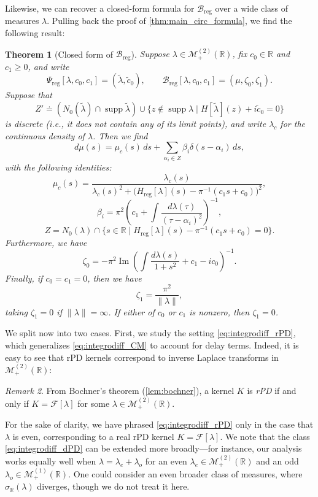 \documentclass{cams-l} %
\newcommand{\RR}{\mathbb R}
\newcommand{\cM}{\mathcal M}
\newcommand{\cB}{\mathcal B}
\newcommand{\cF}{\mathcal F}
\newcommand{\op}{\operatorname}
\newcommand{\supp}{\operatorname{supp}}
\renewcommand{\Im}{\op{Im}}
\newtheorem{theorem}{Theorem}[section]
\theoremstyle{definition}
\theoremstyle{remark}
\newtheorem{remark}[theorem]{Remark}
\numberwithin{equation}{section}
\begin{document}
Likewise, we can recover a closed-form formula for $\cB_\mathrm{reg}$ over a wide class of measures $\lambda$. Pulling back the proof of \cref{thm:main_circ_formula}, we find the following result:
\begin{theorem}[Closed form of $\cB_\mathrm{reg}$]\label{thm:main_regularizedH_formula}
    Suppose $\lambda\in\cM_+^{(2)}(\RR)$, fix $c_0\in\RR$ and $c_1\geq 0$, and write 
    \[\Psi_\mathrm{reg}[\lambda,c_0,c_1] = (\widetilde{\lambda},\widetilde{c}_0),\qquad\cB_\mathrm{reg}[\lambda,c_0,c_1] = (\mu,\zeta_0,\zeta_1).\]
    Suppose that
    \[Z'\doteq \left(N_0(\widetilde{\lambda})\cap\supp\widetilde{\lambda}\right)\cup\{z\notin\supp\lambda\;|\;H[\widetilde{\lambda}](z) + i\widetilde{c}_0= 0\}\]
    is discrete (i.e., it does not contain any of its limit points), and write $\lambda_c$ for the continuous density of $\lambda$. Then we find
    \[
        d\mu(s) = \mu_c(s)\,ds + \sum_{\alpha_i\in Z} \beta_i\delta(s-\alpha_i)\,ds,\]
    with the following identities:
    \[
        \mu_c(s) = \frac{\lambda_c(s)}{\lambda_c(s)^2 + \big(H_\mathrm{reg}[\lambda](s) - \pi^{-1}(c_1s+c_0)\big)^2},\]
        \[\beta_i = \pi^2\left(c_1 + \int\frac{d\lambda(\tau)}{(\tau-\alpha_i)^2}\right)^{-1},
    \]
    \[
        Z = N_0(\lambda)\cap\big\{s\in\RR\;\big|\;H_\mathrm{reg}[\lambda](s) - \pi^{-1}(c_1s + c_0)= 0\big\}.
    \]
    Furthermore, we have
    \[\zeta_0 = -\pi^2\Im\left(\int\frac{d\lambda(s)}{1+s^2} + c_1 - ic_0\right)^{-1}.\]
    Finally, if $c_0=c_1=0$, then we have
    \[\zeta_1 = \frac{\pi^2}{\|\lambda\|},\]
    taking $\zeta_1=0$ if $\|\lambda\|=\infty$. If either of $c_0$ or $c_1$ is nonzero, then $\zeta_1=0$.
\end{theorem}

We split now into two cases. First, we study the setting \ref{eq:integrodiff_rPD}, which generalizes \ref{eq:integrodiff_CM} to account for delay terms. Indeed, it is easy to see that rPD kernels correspond to inverse Laplace transforms in $\cM_+^{(2)}(\RR)$:
\begin{remark}
        From Bochner's theorem (\cref{lem:bochner}), a kernel $K$ is \emph{rPD} if and only if $K = \cF[\lambda]$ for some $\lambda\in\cM_+^{(2)}(\RR)$.
    \end{remark}
For the sake of clarity, we have phrased \ref{eq:integrodiff_rPD} only in the case that $\lambda$ is even, corresponding to a {real} rPD kernel $K=\cF[\lambda]$. We note that the class \ref{eq:integrodiff_dPD} can be extended more broadly---for instance, our analysis works equally well when $\lambda = \lambda_e + \lambda_o$ for an even $\lambda_e\in\cM_+^{(2)}(\RR)$ and an odd $\lambda_o\in\cM_+^{(1)}(\RR)$. One could consider an even broader class of measures, where $\sigma_\RR(\lambda)$ diverges, though we do not treat it here.
\end{document}
